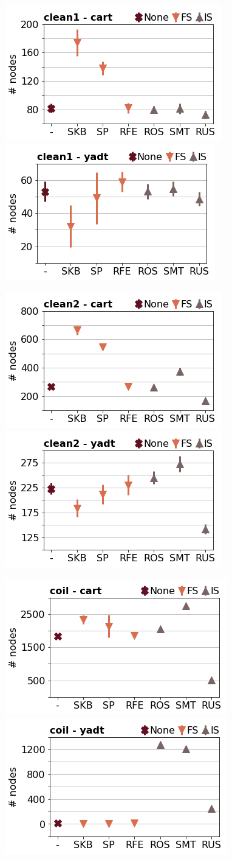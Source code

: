 \documentclass[runningheads,a4paper]{llncs}
\begin{document}
\begin{figure}[!h]
\includegraphics[width=0.32\linewidth]{fig/preps_clean1_DT_sklearn_nbr_nodes.png}
\includegraphics[width=0.32\linewidth]{fig/preps_clean1_DT_yadt_nbr_nodes.png}
\end{figure}


\begin{figure}[!h]
\includegraphics[width=0.32\linewidth]{fig/preps_clean2_DT_sklearn_nbr_nodes.png}
\includegraphics[width=0.32\linewidth]{fig/preps_clean2_DT_yadt_nbr_nodes.png}
\end{figure}


\begin{figure}[!h]
\includegraphics[width=0.32\linewidth]{fig/preps_coil2000_DT_sklearn_nbr_nodes.png}
\includegraphics[width=0.32\linewidth]{fig/preps_coil2000_DT_yadt_nbr_nodes.png}
\end{figure}
\end{document}
